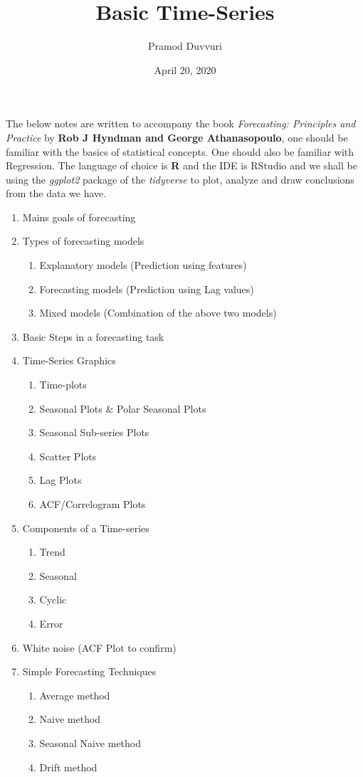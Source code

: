 \documentclass[11pt]{article}
\title{Basic Time-Series}
\author{Pramod Duvvuri}
\date{April 20, 2020}
\begin{document}
	\maketitle
	The below notes are written to accompany the book \textit{Forecasting: Principles and Practice} by \textbf{Rob J Hyndman and George Athanasopoulo}, one should be familiar with the basics of statistical concepts. One should also be familiar with Regression. The language of choice is \textbf{R} and the IDE is RStudio and we shall be using the \textit{ggplot2} package of the \textit{tidyverse} to plot, analyze and draw conclusions from the data we have.
	\begin{enumerate}
	\item Mains goals of forecasting
	\item Types of forecasting models
	\begin{enumerate}
		\item Explanatory models (Prediction using features)
		\item Forecasting models (Prediction using Lag values)
		\item Mixed models (Combination of the above two models)
	\end{enumerate}
     \item Basic Steps in a forecasting task
     \item Time-Series Graphics
     \begin{enumerate}
     	\item Time-plots
     	\item Seasonal Plots \& Polar Seasonal Plots
     	\item Seasonal Sub-series Plots
     	\item Scatter Plots
     	\item Lag Plots
     	\item ACF/Correlogram Plots
     \end{enumerate}
      \item Components of a Time-series
      \begin{enumerate}
      	\item Trend
      	\item Seasonal
      	\item Cyclic
      	\item Error
      \end{enumerate}
       \item White noise (ACF Plot to confirm)
       \item Simple Forecasting Techniques
       \begin{enumerate}
       	\item Average method
       	\item Naive method
       	\item Seasonal Naive method
       	\item Drift method
       \end{enumerate}
	\end{enumerate}
\end{document}
